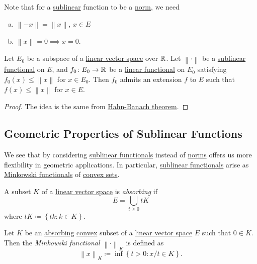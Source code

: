 \begin{remark}
	Note that for a \hyperref[def:sublinear]{sublinear} function to be a \hyperref[def:norm]{norm}, we need
	\begin{enumerate}[(a)]
		\item \(\left\lVert -x\right\rVert =\left\lVert x\right\rVert \), \(x\in E\)
		\item \(\left\lVert x\right\rVert = 0 \implies x = 0\).
	\end{enumerate}
\end{remark}

\begin{theorem}\label{thm:hahn-Banach-Sublinear}
	Let \(E_0\) be a subspace of a \hyperref[def:linear-vector-space]{linear vector space} over \(\mathbb{\MakeUppercase{r}} \). Let \(\left\lVert \cdot\right\rVert \) be a \hyperref[def:sublinear]{sublinear functional} on \(E\), and \(f_0 \colon E_0\to \mathbb{\MakeUppercase{r}} \) be a \hyperref[def:linear-functional]{linear functional} on \(E_0\) satisfying \(f_0(x) \leq \left\lVert x\right\rVert \) for \(x\in E_0\). Then \(f_0\) admits an extension \(f\) to \(E\) such that \(f(x) \leq \left\lVert x\right\rVert \) for \(x\in E\).
\end{theorem}
\begin{proof}
	The idea is the same from \hyperref[thm:Hahn-Banach]{Hahn-Banach theorem}.
\end{proof}

\subsection{Geometric Properties of Sublinear Functions}
We see that by considering \hyperref[def:sublinear]{sublinear functionals} instead of \hyperref[def:norm]{norms} offers us more flexibility in geometric applications. In particular, \hyperref[def:sublinear]{sublinear functionals} arise as \hyperref[def:Minkowski-functional]{Minkowski functionals} of \hyperref[def:convex-set]{convex sets}.
\begin{definition}[Absorbing]\label{def:absorbing}
	A subset \(K\) of a \hyperref[def:linear-vector-space]{linear vector space} is \emph{absorbing} if
	\[
		E = \bigcup\limits_{t \geq 0} tK
	\]
	where \(tK \coloneqq \left\{ tk \colon k\in K \right\} \).
\end{definition}

\begin{definition}\label{def:Minkowski-functional}
	Let \(K\) be an \hyperref[def:absorbing]{absorbing} \hyperref[def:convex-set]{convex} subset of a \hyperref[def:linear-vector-space]{linear vector space} \(E\) such that \(0\in K\). Then the \emph{Minkowski functional} \(\left\lVert \cdot\right\rVert _K\) is defined as
	\[
		\left\lVert x\right\rVert _K \coloneqq \inf \left\{ t > 0 \colon x / t \in K \right\}.
	\]
\end{definition}

